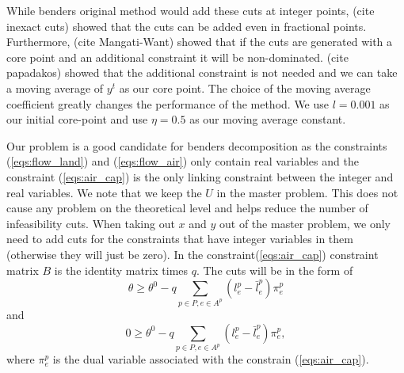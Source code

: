 \documentclass{article}
\begin{document}
	While benders original method would add these cuts at integer points, (cite inexact cuts) showed that the cuts can be added even in fractional points. Furthermore, (cite Mangati-Want) showed that if the cuts are generated with a core point and an additional constraint it will be non-dominated. (cite papadakos) showed that the additional constraint is not needed and we can take a moving average of $y^t$ as our core point. The choice of the moving average coefficient greatly changes the performance of the method. We use $l=0.001$ as our initial core-point and use $\eta=0.5$ as our moving average constant.
	
	Our problem is a good candidate for benders decomposition as the constraints (\ref{eqs:flow_land}) and (\ref{eqs:flow_air}) only contain real variables and the constraint (\ref{eqs:air_cap}) is the only linking constraint between the integer and real variables. We note that we keep the $U$ in the master problem. This does not cause any problem on the theoretical level and helps reduce the number of infeasibility cuts. 
    When taking out $x$ and $y$ out of the master problem, we only need to add cuts for the constraints that have integer variables in them (otherwise they will just be zero). In the constraint(\ref{eqs:air_cap}) constraint matrix $B$ is the identity matrix times $q$. The cuts will be in the form of 
	\begin{equation}
		\theta \geq \theta^0  - q\sum_{p \in P, e \in A^p} (l^p_e - \bar{l}^p_e) \pi^p_e
	\end{equation}
	and
	\begin{equation}
		0 \geq \theta^0 - q\sum_{p \in P, e \in A^p} (l^p_e - \bar{l}^p_e)  \pi^p_e,
	\end{equation}
	where $ \pi^p_e$ is the dual variable associated with the constrain (\ref{eqs:air_cap}).
	
\end{document}
